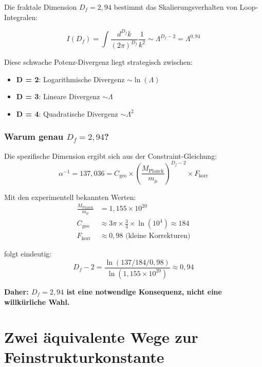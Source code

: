 \documentclass[12pt,a4paper]{article}
\theoremstyle{definition}
\begin{document}
	Die fraktale Dimension $D_f = 2{,}94$ bestimmt das Skalierungsverhalten von Loop-Integralen:
	
	\begin{equation}
		I(D_f) = \int \frac{d^{D_f} k}{(2\pi)^{D_f}} \frac{1}{k^2} \sim \Lambda^{D_f-2} = \Lambda^{0{,}94}
	\end{equation}
	
	Diese schwache Potenz-Divergenz liegt strategisch zwischen:
	\begin{itemize}
		\item \textbf{D = 2}: Logarithmische Divergenz $\sim \ln(\Lambda)$
		\item \textbf{D = 3}: Lineare Divergenz $\sim \Lambda$
		\item \textbf{D = 4}: Quadratische Divergenz $\sim \Lambda^2$
	\end{itemize}
	
	\subsubsection{Warum genau $D_f = 2{,}94$?}
	
	Die spezifische Dimension ergibt sich aus der Constraint-Gleichung:
	\begin{equation}
		\alpha^{-1} = 137{,}036 = C_{\text{geo}} \times \left(\frac{M_{\text{Planck}}}{m_\mu}\right)^{D_f-2} \times F_{\text{korr}}
	\end{equation}
	
	Mit den experimentell bekannten Werten:
	\begin{align}
		\frac{M_{\text{Planck}}}{m_\mu} &= 1{,}155 \times 10^{20} \\
		C_{\text{geo}} &\approx 3\pi \times \frac{3}{4} \times \ln(10^4) \approx 184 \\
		F_{\text{korr}} &\approx 0{,}98 \text{ (kleine Korrekturen)}
	\end{align}
	
	folgt eindeutig:
	\begin{equation}
		D_f - 2 = \frac{\ln(137/184/0{,}98)}{\ln(1{,}155 \times 10^{20})} \approx 0{,}94
	\end{equation}
	
	\textbf{Daher: $D_f = 2{,}94$ ist eine notwendige Konsequenz, nicht eine willkürliche Wahl.}
	
	\section{Zwei äquivalente Wege zur Feinstrukturkonstante}
	
\end{document}

